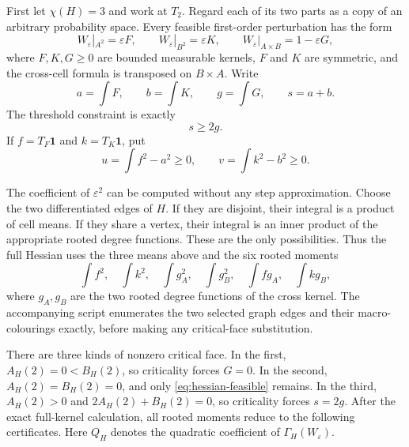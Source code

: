 \documentclass[11pt]{article}
\begin{document}
First let $\chi(H)=3$ and work at $T_2$.  Regard each of its two parts as a
copy of an arbitrary probability space.  Every feasible first-order
perturbation has the form
\begin{equation}
 W_\varepsilon|_{A^2}=\varepsilon F,\qquad
 W_\varepsilon|_{B^2}=\varepsilon K,\qquad
 W_\varepsilon|_{A\times B}=1-\varepsilon G,
 \label{eq:full-perturbation}
\end{equation}
where $F,K,G\geq0$ are bounded measurable kernels, $F$ and $K$ are
symmetric, and the cross-cell formula is transposed on $B\times A$.
Write
\[
 a=\int F,\qquad b=\int K,\qquad g=\int G,
 \qquad s=a+b.
\]
The threshold constraint is exactly
\begin{equation}
 s\geq2g.
 \label{eq:hessian-feasible}
\end{equation}
If $f=T_F\mathbf1$ and $k=T_K\mathbf1$, put
\[
 u=\int f^2-a^2\geq0,
 \qquad
 v=\int k^2-b^2\geq0.
\]

The coefficient of $\varepsilon^2$ can be computed without any step
approximation.  Choose the two differentiated edges of $H$.  If they are
disjoint, their integral is a product of cell means.  If they share a
vertex, their integral is an inner product of the appropriate rooted degree
functions.  These are the only possibilities.  Thus the full Hessian uses
the three means above and the six rooted moments
\[
 \int f^2,\quad \int k^2,\quad
 \int g_A^2,\quad\int g_B^2,\quad
 \int f g_A,\quad\int k g_B,
\]
where $g_A,g_B$ are the two rooted degree functions of the cross kernel.
The accompanying script enumerates the two selected graph edges and their
macro-colourings exactly, before making any critical-face substitution.

There are three kinds of nonzero critical face.  In the first,
$A_H(2)=0<B_H(2)$, so criticality forces $G=0$.  In the second,
$A_H(2)=B_H(2)=0$, and only \eqref{eq:hessian-feasible} remains.  In the
third, $A_H(2)>0$ and $2A_H(2)+B_H(2)=0$, so criticality forces $s=2g$.
After the exact full-kernel calculation, all rooted moments reduce to the
following certificates.  Here $Q_H$ denotes the quadratic coefficient of
$\Gamma_H(W_\varepsilon)$.
\end{document}
